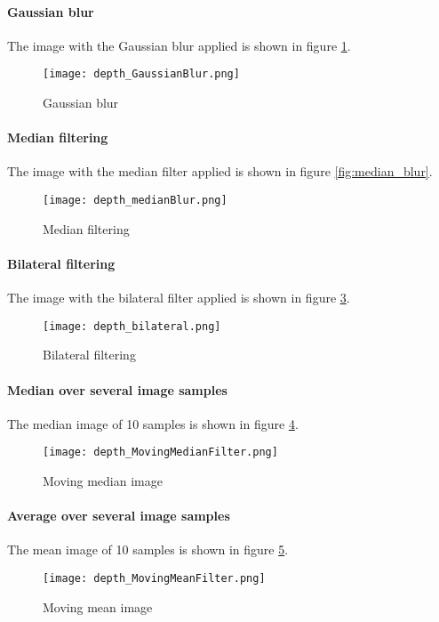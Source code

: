 \documentclass[DIV12,a4paper]{scrartcl}
\begin{document}
\paragraph{Gaussian blur}
The image with the Gaussian blur applied is shown in figure \ref{fig:gaussian_blur}.
\begin{figure}[!htbp]
  \centering
  \texttt{[image: depth\_GaussianBlur.png]}
  \caption{Gaussian blur}
  \label{fig:gaussian_blur}
\end{figure}
\paragraph{Median filtering}
The image with the median filter applied is shown in figure \ref{fig:median_blur}.
\begin{figure}[!htbp]
  \centering
  \texttt{[image: depth\_medianBlur.png]}
  \caption{Median filtering}
  \label{fig:median_depth}
\end{figure}
\paragraph{Bilateral filtering}
The image with the bilateral filter applied is shown in figure \ref{fig:bilateral_depth}.
\begin{figure}[!htbp]
  \centering
  \texttt{[image: depth\_bilateral.png]}
  \caption{Bilateral filtering}
  \label{fig:bilateral_depth}
\end{figure}
\paragraph{Median over several image samples}
The median image of 10 samples is shown in figure \ref{fig:moving_median_depth}.
\begin{figure}[!htbp]
  \centering
  \texttt{[image: depth\_MovingMedianFilter.png]}
  \caption{Moving median image}
  \label{fig:moving_median_depth}
\end{figure}
\paragraph{Average over several image samples}
The mean image of 10 samples is shown in figure \ref{fig:moving_mean_depth}.
\begin{figure}[!htbp]
  \centering
  \texttt{[image: depth\_MovingMeanFilter.png]}
  \caption{Moving mean image}
  \label{fig:moving_mean_depth}
\end{figure}
\end{document}
